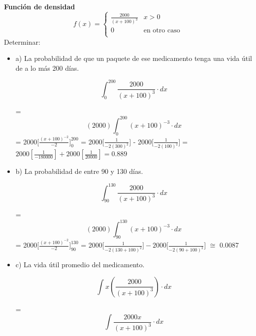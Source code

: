 \documentclass{../oxmathproblems}
\begin{document}
\begin{questions}

\miquestion\textbf{Función de densidad}
\[   
f(x) = 
     \begin{cases}
       \frac{2000}{(x+100)^3} & x > 0 \\
       0 & \text{en otro caso} \\
     \end{cases}
\]
$$$$
Determinar: 
\begin{itemize}
\item  a) La probabilidad de que un paquete de ese medicamento tenga una vida útil de a lo más 200 días. 


 \begin{equation}
\int_{0}^{200} \frac{2000}{(x+100)^3} \cdot dx
\end{equation}

= \begin{equation}
(2000 )\int_{0}^{200} (x+100)^{-3} \cdot dx
\end{equation}
= 2000[$\frac{(x+100)^{-2}}{-2}]^{200}_{0}$  = 
2000[$\frac{1}{-2(300)^2}]$ - 2000[$\frac{1}{-2(100)^2}]  = $
 $ 2000[\frac{1}{-180 000}]  + 2000[\frac{1}{20000}] = 0.889 $


\item  b) La probabilidad de entre 90 y 130 días.


 \begin{equation}
\int_{90}^{130} \frac{2000}{(x+100)^3} \cdot dx
\end{equation}

= \begin{equation}
(2000 )\int_{90}^{130} (x+100)^{-3} \cdot dx
\end{equation}
= 2000[$\frac{(x+100)^{-2}}{-2}]^{130}_{90}$  = 
2000[$\frac{1}{-2(130 + 100)^2}] - 2000$[$\frac{1}{-2(90 + 100)^2}]$  $\cong$ 0.0087

\item  c) La vida útil promedio del medicamento. 

 \begin{equation}
\int x(\frac{2000}{(x+100)^3}) \cdot dx
\end{equation}

=  \begin{equation}
\int \frac{2000x}{(x+100)^3} \cdot dx
\end{equation}


\end{itemize}
\end{questions}
\end{document}
